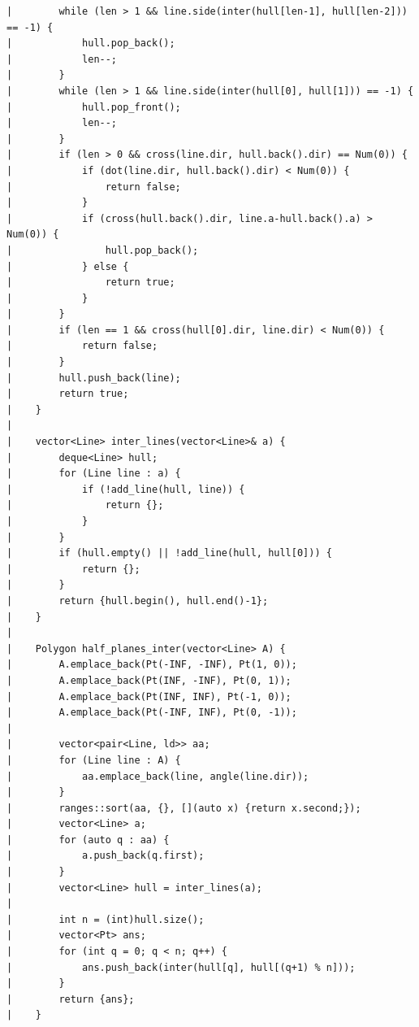 \documentclass[a4paper, 10pt]{article}
\begin{document}
\begin{center}
\begin{verbatim}
|        while (len > 1 && line.side(inter(hull[len-1], hull[len-2])) == -1) {
|            hull.pop_back();
|            len--;
|        }
|        while (len > 1 && line.side(inter(hull[0], hull[1])) == -1) {
|            hull.pop_front();
|            len--;
|        }
|        if (len > 0 && cross(line.dir, hull.back().dir) == Num(0)) {
|            if (dot(line.dir, hull.back().dir) < Num(0)) {
|                return false;
|            }
|            if (cross(hull.back().dir, line.a-hull.back().a) > Num(0)) {
|                hull.pop_back();
|            } else {
|                return true;
|            }
|        }
|        if (len == 1 && cross(hull[0].dir, line.dir) < Num(0)) {
|            return false;
|        }
|        hull.push_back(line);
|        return true;
|    }
|    
|    vector<Line> inter_lines(vector<Line>& a) {
|        deque<Line> hull;
|        for (Line line : a) {
|            if (!add_line(hull, line)) {
|                return {};
|            }
|        }
|        if (hull.empty() || !add_line(hull, hull[0])) {
|            return {};
|        }
|        return {hull.begin(), hull.end()-1};
|    }
|    
|    Polygon half_planes_inter(vector<Line> A) {
|        A.emplace_back(Pt(-INF, -INF), Pt(1, 0));
|        A.emplace_back(Pt(INF, -INF), Pt(0, 1));
|        A.emplace_back(Pt(INF, INF), Pt(-1, 0));
|        A.emplace_back(Pt(-INF, INF), Pt(0, -1));
|    
|        vector<pair<Line, ld>> aa;
|        for (Line line : A) {
|            aa.emplace_back(line, angle(line.dir));
|        }
|        ranges::sort(aa, {}, [](auto x) {return x.second;});
|        vector<Line> a;
|        for (auto q : aa) {
|            a.push_back(q.first);
|        }
|        vector<Line> hull = inter_lines(a);
|    
|        int n = (int)hull.size();
|        vector<Pt> ans;
|        for (int q = 0; q < n; q++) {
|            ans.push_back(inter(hull[q], hull[(q+1) % n]));
|        }
|        return {ans};
|    }
\end{verbatim}


\end{center}
\end{document}
